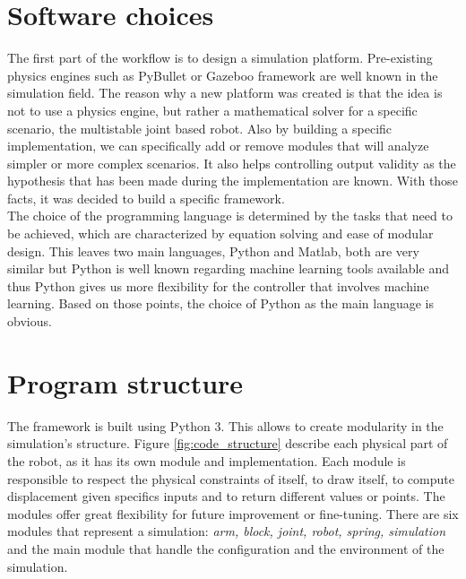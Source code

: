 
    \section{Software choices}
        The first part of the workflow is to design a simulation platform. Pre-existing physics engines such as PyBullet or Gazeboo framework are well known in the simulation field. The reason why a new platform was created is that the idea is not to use a physics engine, but rather a mathematical solver for a specific scenario, the multistable joint based robot. Also by building a specific implementation, we can specifically add or remove modules that will analyze simpler or more complex scenarios. It also helps controlling output validity as the hypothesis that has been made during the implementation are known. With those facts, it was decided to build a specific framework.\\
        
        The choice of the programming language is determined by the tasks that need to be achieved, which are characterized by equation solving and ease of modular design. This leaves two main languages, Python and Matlab, both are very similar but Python is well known regarding machine learning tools available and thus Python gives us more flexibility for the controller that involves machine learning. Based on those points, the choice of Python as the main language is obvious.
    
    \section{Program structure}\label{sec:program_structure}
        The framework is built using Python 3. This allows to create modularity in the simulation's structure. Figure \ref{fig:code_structure} describe each physical part of the robot, as it has its own module and implementation. Each module is responsible to respect the physical constraints of itself, to draw itself, to compute displacement given specifics inputs and to return different values or points. The modules offer great flexibility for future improvement or fine-tuning. There are six modules that represent a simulation: \textit{arm, block, joint, robot, spring, simulation} and the main module that handle the configuration and the environment of the simulation. \\
        
